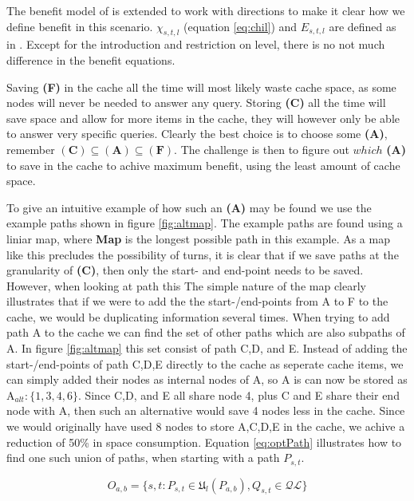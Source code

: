The benefit model of \cite{thomsen2012} is extended to work with directions to make it clear how we define benefit in this
scenario. $\chi_{s,t,l}$ (equation \ref{eq:chil}) and $E_{s,t,l}$ are defined as in \cite{thomsen2012}. Except for the introduction and restriction on level, there is no not much difference in the benefit equations. 


Saving \textbf{(F)} in the cache all the time will most likely waste cache space, as some nodes will never be needed to answer any query. Storing \textbf{(C)} all the time will save space and allow for more items in the cache, they will however only be able to answer very specific queries. Clearly the best choice is to choose some \textbf{(A)}, remember $(\textbf{C}) \subseteq (\textbf{A}) \subseteq (\textbf{F})$. The challenge is then to figure out $which$ \textbf{(A)} to save in the cache to achive maximum benefit, using the least amount of cache space. 

To give an intuitive example of how such an \textbf{(A)} may be found we use the example paths shown in figure \ref{fig:altmap}. The example paths are found using a liniar map, where \textbf{Map} is the longest possible path in this example. As a map like this precludes the possibility of turns, it is clear that if we save paths at the granularity of \textbf{(C)}, then only the start- and end-point needs to be saved. However, when looking at path this The simple nature of the map clearly illustrates that if we were to add the the start-/end-points from A to F to the cache, we would be duplicating information several times. When trying to add path A to the cache we can find the set of other paths which are also subpaths of A. In figure \ref{fig:altmap} this set consist of path C,D, and E. Instead of adding the start-/end-points of path C,D,E directly to the cache as seperate cache items, we can simply added their nodes as internal nodes of A, so A is can now be stored as A$_{alt}: \{1,3,4,6\}$. Since C,D, and E all share node 4, plus C and E share their end node with A, then such an alternative would save 4 nodes less in the cache. Since we would originally have used 8 nodes to store A,C,D,E in the cache, we achive a reduction of 50\% in space consumption. Equation \ref{eq:optPath} illustrates how to find one such union of paths, when starting with a path $P_{s,t}$. 



\begin{equation}\label{eq:optPath}
O_{a,b} = \{s,t : P_{s,t} \in \mathfrak{U}_l(P_{a,b}),  Q_{s,t} \in \mathcal{QL}\}
\end{equation}


